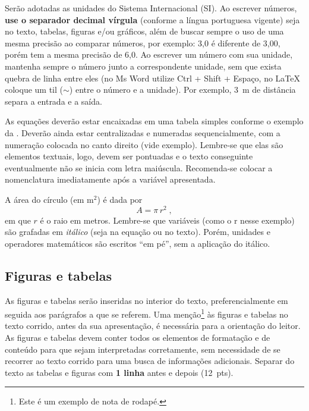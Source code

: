 \documentclass[12pt, a4paper, oneside, onecolumn] {article}%
\begin{document}
Serão adotadas as unidades do Sistema Internacional (SI). Ao escrever números, \textbf{use o separador decimal vírgula} (conforme a língua portuguesa vigente) seja no texto, tabelas, figuras e/ou gráficos, além de buscar sempre o uso de uma mesma precisão ao comparar números, por exemplo: 3,0 é diferente de 3,00, porém tem a mesma precisão de 6,0. Ao escrever um número com sua unidade, mantenha sempre o número junto a correspondente unidade, sem que exista quebra de linha entre eles (no Ms Word utilize Ctrl + Shift + Espaço, no \LaTeX\xspace coloque um til ($\sim$) entre o número e a unidade). Por exemplo, 3~m de distância separa a entrada e a saída.

As equações deverão estar encaixadas em uma tabela simples conforme o exemplo da . Deverão ainda estar centralizadas e numeradas sequencialmente, com a numeração colocada no canto direito (vide exemplo). Lembre-se que elas são elementos textuais, logo, devem ser pontuadas e o texto conseguinte eventualmente não se inicia com letra maiúscula. Recomenda-se colocar a nomenclatura imediatamente após a variável apresentada.

A área do círculo (em m$^2$) é dada por 
\begin{equation}
	A = \pi \, r^2\;,
\label{eq:area-circ}
\end{equation}
%
em que $r$ é o raio em metros. Lembre-se que variáveis (como o r nesse exemplo) são grafadas em \textit{itálico} (seja na equação ou no texto). Porém, unidades e operadores matemáticos são escritos ``em pé'', sem a aplicação do itálico.

\subsection{Figuras e tabelas}

As figuras e tabelas serão inseridas no interior do texto, preferencialmente em seguida aos parágrafos a que se referem. Uma menção\footnote{Este é um exemplo de nota de rodapé.} às figuras e tabelas no texto corrido, antes da sua apresentação, é necessária para a orientação do leitor. As figuras e tabelas devem conter todos os elementos de formatação e de conteúdo para que sejam interpretadas corretamente, sem necessidade de se recorrer ao texto corrido para uma busca de informações adicionais. Separar do texto as tabelas e figuras com \textbf{1 linha} antes e depois (12~pts). 
\end{document}
